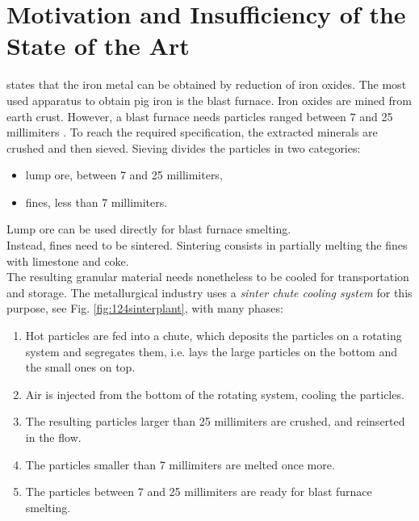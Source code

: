 
\chapter{Motivation and Insufficiency of the State of the Art}
\label{cap:insufficiency}


\citet{RefWorks:195} states that the iron metal can be obtained by reduction of
iron oxides. The most used apparatus to obtain pig iron is the blast furnace.
Iron oxides are mined from earth crust. 
However, a blast furnace needs particles
ranged between 7 and 25 millimiters \cite{RefWorks:195}.
To reach the required specification, the extracted minerals are crushed and then
sieved. Sieving divides the particles in two categories:
\begin{itemize}
  \item{lump ore, between 7 and 25 millimiters,}
  \item{fines, less than 7 millimiters.} 
\end{itemize}

Lump ore can be used directly for blast furnace smelting.\\

Instead, fines need to be sintered. 
Sintering consists in partially melting the
fines with limestone and coke.\\
The resulting granular material needs nonetheless to be cooled for
transportation and storage. 
The metallurgical industry uses a \textit{sinter chute cooling system} for this
purpose, see Fig. \ref{fig:124sinterplant}, with many phases:
\begin{enumerate}
  \item{Hot particles are fed into a chute, which deposits the
  particles on a rotating system and segregates them, i.e. lays the large
  particles on the bottom and the small ones on top.}
  \item{Air is injected from the bottom of the rotating system, cooling the
  particles.}
  \item{The resulting particles larger than 25 millimiters are crushed, and
  reinserted in the flow.}
  \item{The particles smaller than 7 millimiters are melted once
  more.}
  \item{The particles between 7 and 25 millimiters are ready for blast furnace
  smelting.}
\end{enumerate}

